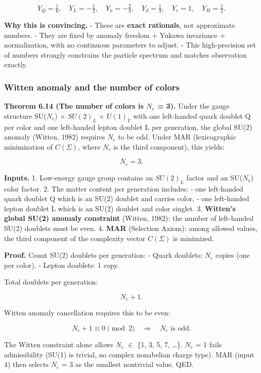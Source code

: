 \documentclass[11pt,a4paper]{article}
\theoremstyle{remark}
\begin{document}
\[
Y_Q = \tfrac{1}{6}, \quad
Y_L = -\tfrac{1}{2}, \quad
Y_u = -\tfrac{2}{3}, \quad
Y_d = \tfrac{1}{3}, \quad
Y_e = 1, \quad
Y_H = \tfrac{1}{2}.
\]

\textbf{Why this is convincing.}
- These are \textbf{exact rationals}, not approximate numbers.
- They are fixed by anomaly freedom + Yukawa invariance + normalization,
with no continuous parameters to adjust.
- This high-precision set of numbers strongly constrains the particle
spectrum and matches observation exactly.

\subsubsection{Witten anomaly and the number of colors}\label{witten-anomaly-and-the-number-of-colors}

\textbf{Theorem 6.14 (The number of colors is \(N_c\) = 3).}
Under the gauge structure SU(\(N_c\)) \ensuremath{\times} \(SU(2)_L\) \ensuremath{\times} \(U(1)_Y\) with one
left-handed quark doublet Q per color and one left-handed lepton doublet
L per generation, the global SU(2) anomaly (Witten, 1982) requires
\(N_c\) to be odd. Under MAR (lexicographic minimization of \(C(\Sigma)\),
where \(N_c\) is the third component), this yields:

\[
N_c = 3.
\]

\textbf{Inputs.}
1. Low-energy gauge group contains an \(SU(2)_L\) factor and an SU(\(N_c\))
color factor.
2. The matter content per generation includes:
- one left-handed quark doublet Q which is an SU(2) doublet and
carries color,
- one left-handed lepton doublet L which is an SU(2) doublet and
color singlet.
3. \textbf{Witten's global SU(2) anomaly constraint} (Witten, 1982): the
number of left-handed SU(2) doublets must be even.
4. \textbf{MAR} (Selection Axiom): among allowed values, the third component
of the complexity vector \(C(\Sigma)\) is minimized.

\textbf{Proof.} Count SU(2) doublets per generation:
- Quark doublets: \(N_c\) copies (one per color),
- Lepton doublets: 1 copy.

Total doublets per generation:

\[
N_c + 1.
\]

Witten anomaly cancellation requires this to be even:

\[
N_c + 1 \equiv 0 \pmod{2} \quad \Rightarrow \quad N_c \text{ is odd}.
\]

The Witten constraint alone allows \(N_c\) \ensuremath{\in} \{1, 3, 5, 7, \ldots\}. \(N_c\) = 1
fails admissibility (SU(1) is trivial, no complex nonabelian charge type).
MAR (input 4) then selects \(N_c\) = 3 as the smallest nontrivial value. QED.
\end{document}
